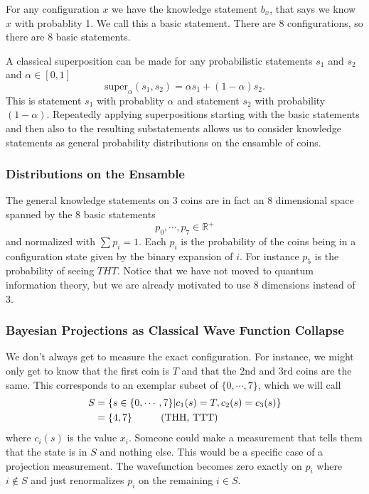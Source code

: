 \documentclass[12pt,a4paper]{article}
\begin{document}
For any configuration $x$ we have the knowledge statement $b_x$, that says we know $x$ with probablity 1.  We call this a basic statement.  There are 8 configurations, so there are 8 basic statements.

A classical superposition can be made for any probabilistic statements $s_1$ and $s_2$ and $\alpha \in [0,1]$
\[
\text{super}_\alpha(s_1,s_2) = \alpha s_1 + (1 -\alpha) s_2.
\]
This is statement $s_1$ with probablity $\alpha$ and statement $s_2$ with probability $(1-\alpha)$.  Repeatedly applying superpositions starting with the basic statements and then also to the resulting substatements allows us to consider knowledge statements as general probability distributions on the ensamble of coins.

\subsubsection{Distributions on the Ensamble}
The general knowledge statements on 3 coins are in fact an 8 dimensional space spanned by the 8 basic statements
\[
   p_0,\cdots,p_{7} \in \mathbb{R}^+
\]
and normalized with $\sum p_i = 1$.  Each $p_i$ is the probability of the coins being in a configuration state given by the binary expansion of $i$.  For instance $p_5$ is the probability of seeing $THT$. Notice that we have not moved to quantum information theory, but we are already motivated to use 8 dimensions instead of 3.

\subsubsection{Bayesian Projections as Classical Wave Function Collapse}
\label{proj}
We don't always get to measure the exact configuration.  For instance, we might only get to know that the first coin is $T$ and that the 2nd and 3rd coins are the same.  This corresponds to an exemplar subset of $\{0,\cdots,7\}$, which we will call
\[
\begin{split}
  S &= \{s \in \{0,\cdots,7\} | c_1(s) = T, c_2(s) = c_3(s) \} \\
    & = \{4,7\} \hspace{0.4 in} \text{(THH, TTT)}
\end{split}
\]
where $c_i(s)$ is the value $x_i$.  Someone could make a measurement that tells them that the state is in $S$ and nothing else.  This would be a specific case of a projection measurement.  The wavefunction becomes zero exactly on $p_i$ where $i \not \in S$ and just renormalizes $p_i$ on the remaining $i \in S$.
\end{document}
